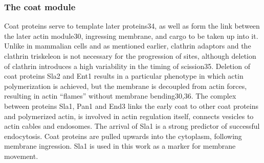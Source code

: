 			\subsubsection{The coat module}
			Coat proteins serve to template later proteins34, as well as form the link between the later actin module30, ingressing membrane, and cargo to be taken up into it. Unlike in mammalian cells and as mentioned earlier, clathrin adaptors and the clathrin triskeleon is not necessary for the progression of sites, although deletion of clathrin introduces a high variability in the timing of scission35. 
			\vspace{5mm}
			Deletion of coat proteins Sla2 and Ent1 results in a particular phenotype in which actin polymerization is achieved, but the membrane is decoupled from actin forces, resulting in actin “flames” without membrane bending30,36. The complex between proteins Sla1, Pan1 and End3 links the early coat to other coat proteins and polymerized actin, is involved in actin regulation itself, connects vesicles to actin cables and endosomes. The arrival of Sla1 is a strong predictor of successful endocytosis. Coat proteins are pulled upwards into the cytoplasm, following membrane ingression. Sla1 is used in this work as a marker for membrane movement.

